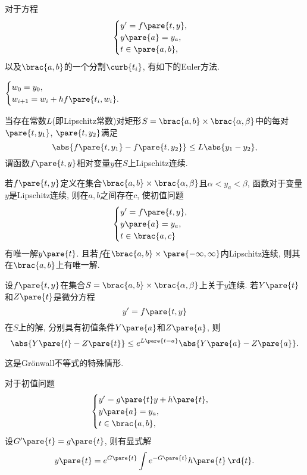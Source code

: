 \documentclass{ctexart}
\begin{document}
对于方程
\[ \begin{cases}
    y' = f\pare{t,y},\\
    y\pare{a} = y_a, \\
    t\in\pare{a,b},
\end{cases} \]
以及$\brac{a,b}$的一个分割$\curb{t_i}$, 有如下的Euler方法.
\begin{theorem}[Euler方法]
    $\displaystyle \begin{cases}
        w_0 = y_0, \\
        w_{i+1} = w_i + hf\pare{t_i,w_i}.
    \end{cases}$
\end{theorem}
\begin{definition}
    当存在常数$L$(即Lipschitz常数)对矩形$S=\brac{a,b}\times\brac{\alpha,\beta}$中的每对$\pare{t,y_1}$, $\pare{t,y_2}$满足
    \[ \abs{f\pare{t,y_1} - f\pare{t,y_2}} \le L\abs{y_1-y_2}, \]
    谓函数$f\pare{t,y}$相对变量$y$在$S$上Lipschitz连续.
\end{definition}
\begin{theorem}
    若$f\pare{t,y}$定义在集合$\brac{a,b}\times\brac{\alpha,\beta}$且$\alpha < y_a < \beta$, 函数对于变量$y$是Lipschitz连续, 则在$a,b$之间存在$c$, 使初值问题
    \[ \begin{cases}
        y' = f\pare{t,y}, \\
        y\pare{a} = y_a, \\
        t \in \brac{a,c}
    \end{cases} \]
    有唯一解$y\pare{t}$. 且若$f$在$\brac{a,b}\times \pare{-\infty,\infty}$内Lipschitz连续, 则其在$\brac{a,b}$上有唯一解.
\end{theorem}
\begin{theorem}
    设$f\pare{t,y}$在集合$S=\brac{a,b}\times \brac{\alpha,\beta}$上关于$y$连续. 若$Y\pare{t}$和$Z\pare{t}$是微分方程
    \[ y' = f\pare{t,y} \]
    在$S$上的解, 分别具有初值条件$Y\pare{a}$和$Z\pare{a}$, 则
    \[ \abs{Y\pare{t} - Z\pare{t}} \le e^{L\pare{t-a}}\abs{Y\pare{a} - Z\pare{a}}. \]
\end{theorem}
\begin{remark}
    这是Gr\"onwall不等式的特殊情形.
\end{remark}
对于初值问题
\[ \begin{cases}
    y' = g\pare{t} y + h\pare{t}, \\
    y\pare{a} = y_a, \\
    t\in\brac{a,b},
\end{cases} \]
设$G'\pare{t} = g\pare{t}$, 则有显式解
\[ y\pare{t} = e^{G\pare{t}} \int e^{-G\pare{t}}h\pare{t}\,\rd{t}. \]
\end{document}
